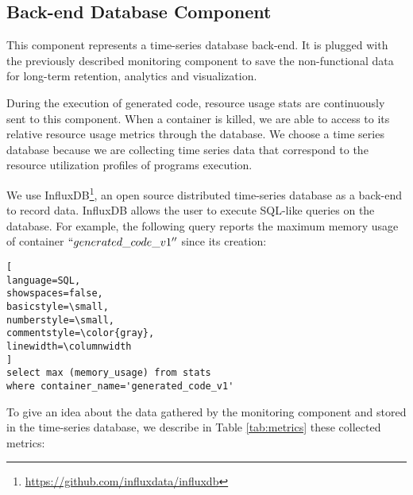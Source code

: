 \subsection{Back-end Database Component}
This component represents a time-series database back-end. It is plugged with the previously described monitoring component to save the non-functional data for long-term retention, analytics and visualization. 

During the execution of generated code, resource usage stats are continuously sent to this component. When a container is killed, we are able to access to its relative resource usage metrics through the database. We choose a time series database because we are collecting time series data that correspond to the resource utilization profiles of programs execution.

We use InfluxDB\footnote{\url{https://github.com/influxdata/influxdb}}, an open source distributed time-series database as a back-end to record data. InfluxDB allows the user to execute SQL-like queries on the database. For example, the following query reports the maximum memory usage of container $``generated\_code\_v1''$ since its creation:

\begin{lstlisting}[
language=SQL,
showspaces=false,
basicstyle=\small,
numberstyle=\small,
commentstyle=\color{gray},
linewidth=\columnwidth
]
select max (memory_usage) from stats 
where container_name='generated_code_v1'
\end{lstlisting}
To give an idea about the data gathered by the monitoring component and stored in the time-series database, we describe in Table \ref{tab:metrics} these collected metrics:
\begin{table}[h]
	\begin{center}
		
	\end{center}
	\caption {Resource usage metrics recorded in InfluxDB}
	\label{tab:metrics}
\end{table}

